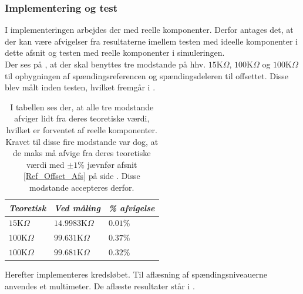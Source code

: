 \subsubsection{Implementering og test}
I implementeringen arbejdes der med reelle komponenter. Derfor antages det, at der kan være afvigelser fra resultaterne imellem testen med ideelle komponenter i dette afsnit og testen med reelle komponenter i simuleringen. \\
Der ses på , at der skal benyttes tre modstande på hhv. $15$K$\Omega$, $100$K$\Omega$ og $100$K$\Omega$ til opbygningen af spændingsreferencen og spændingsdeleren til offsettet. Disse blev målt inden testen, hvilket fremgår i .

\begin{table}[H]
	\centering
	\begin{tabular}{|l|l|l|}
		\hline
		\textit{Teoretisk} & \textit{Ved måling} & \textit{\% afvigelse} \\ \hline
		$15$K$\Omega$       & $14.9983$K$\Omega$   & $0.01$\%               \\ \hline
		$100$K$\Omega$      & $99.631$K$\Omega$    & $0.37$\%               \\ \hline
		$100$K$\Omega$      & $99.681$K$\Omega$    & $0.32$\%               \\ \hline
	\end{tabular}
	\caption{I tabellen ses der, at alle tre modstande afviger lidt fra deres teoretiske værdi, hvilket er forventet af reelle komponenter. Kravet til disse fire modstande var dog, at de maks må afvige fra deres teoretiske værdi med $\pm1\%$ jævnfør afsnit \ref{Ref_Offset_Afs} på side \pageref{Ref_Offset_Afs}. Disse modstande accepteres derfor.}
	\label{Tab:modstand_Kompar}
\end{table}
\noindent Herefter implementeres kredsløbet. Til aflæsning af spændingsniveauerne anvendes et multimeter. De aflæste resultater står i .
